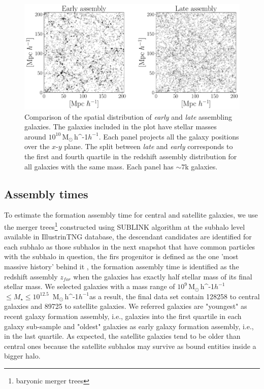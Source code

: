 \documentclass[a4paper,fleqn,usenatbib]{mnras}
\newcommand{\Msunh}{\,{\rm M}$_{\odot}$\,\ifmmode h^{-1}\else $h^{-1}$\fi}
\begin{document}
 \begin{figure}
    \centering
    \includegraphics[width=1.8\columnwidth]{figuras/scatter_assembly.pdf}
    \caption{Comparison of the spatial distribution of \emph{early} and \emph{late} assembling galaxies.
    The galaxies included in the plot have stellar masses around $10^{10}$\Msunh. 
    Each panel projects all the galaxy positions over the $x$-$y$ plane. 
    The split between \emph{late} and \emph{early} corresponds to the first and fourth quartile in the redshift assembly distribution for all galaxies with the same mass.
    Each panel has $\sim7$k galaxies. }
    \label{fig:comparison}
\end{figure}


\subsection{Assembly times}
\label{sec:assembly_times}
To estimate the formation assembly time for central and satellite
galaxies, we use the merger trees\footnote{baryonic merger trees}
constructed using SUBLINK algorithm at the subhalo level available in
IllustrinTNG database, the descendant candidates are identified for
each subhalo as those subhalos in the next snapshot that have common
particles with the subhalo in question, the firs progenitor is defined
as the one 'most massive history' behind it
\citep{2015MNRAS.449...49R}, the formation assembly time is identified
as the redshift assembly $z_{for}$ when the galaxies has exactly half
stellar mass of its final stellar mass. We selected galaxies with a
mass range of $10^{9}$\Msunh $\leq M_{\star} \leq 10^{12.5}$ \Msunh as
a result, the final data set contain 128258 to central galaxies and
89725 to satellite galaxies. We referred galaxies are "youngest" as
recent galaxy formation assembly, i.e., galaxies into the first
quartile in each galaxy sub-sample and "oldest" galaxies as early
galaxy formation assembly, i.e., in the last quartile. As expected,
the satellite galaxies tend to be older than central ones because the
satellite subhalos may survive as bound entities inside a bigger halo.
\end{document}
